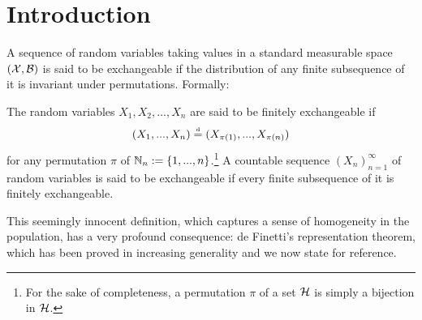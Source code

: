 

\section{Introduction}


A sequence of random variables taking values in a standard measurable space $(\mathcal{X}, \mathcal{B})$ is said to be exchangeable if the distribution of any finite subsequence of it is invariant under permutations. Formally:

\begin{definition}[Exchangeability] \label{def:exchangeability}
	The random variables $X_1, X_2, ..., X_n$ are said to be finitely exchangeable if
	\begin{equation*}
		(X_1, ..., X_n) \stackrel{\text{\rm\tiny d}}{=} (X_{\pi(1)}, ..., X_{\pi(n)})
	\end{equation*}
	for any permutation $\pi$ of $\mathbb{N}_n :=\{1, ..., n \}$.\footnote{For the sake of completeness, a permutation $\pi$ of a set $\mathcal{H}$ is simply a bijection in $\mathcal{H}$.} A countable sequence $(X_n)_{n=1}^{\infty}$ of random variables is said to be exchangeable if every finite subsequence of it is finitely exchangeable.
\end{definition}





This seemingly innocent definition, which captures a sense of homogeneity in the population, has a very profound consequence: de Finetti's representation theorem, which has been proved in increasing generality \cite{deFinetti:1930:RepTheorem, HewittSavage:1955:rep_theorem, DiaconisFreedman:1978:Generalizations} and we now state for reference.


